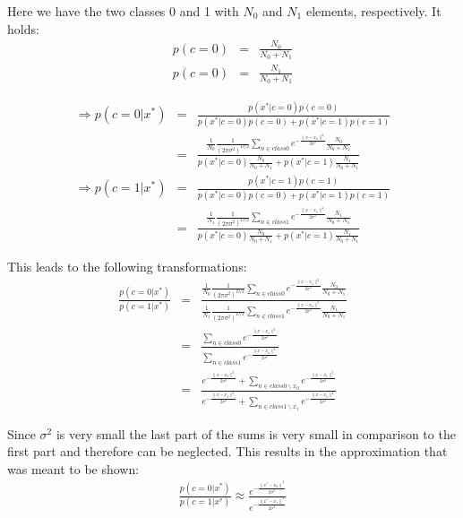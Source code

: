 \documentclass{article}
\begin{document}
Here we have the two classes 0 and 1 with $N_0$ and $N_1$ elements, respectively.
It holds:
\begin{eqnarray}
p(c = 0) &=& \frac{N_0}{N_0 + N_1}\\
p(c = 0) &=& \frac{N_1}{N_0 + N_1}
\end{eqnarray}

\begin{eqnarray}
\Rightarrow p(c = 0 | x^*) &=& \frac{p(x^* | c = 0)p(c = 0)}{p(x^* | c = 0)p(c = 0) + p(x^* | c = 1)p(c = 1)}\\
&=& \frac{\frac{1}{N_0} \frac{1}{(2\pi \sigma^2)^{D/2}} \sum_{n \in class 0}{e^{-\frac{\|x -x_n\|^2}{2 \sigma^2}}}\frac{N_0}{N_0 + N_1}}{p(x^* | c = 0)\frac{N_0}{N_0 + N_1} + p(x^* | c = 1)\frac{N_1}{N_0 + N_1}}\\
\Rightarrow p(c = 1 | x^*) &=& \frac{p(x^* | c = 1)p(c = 1)}{p(x^* | c = 0)p(c = 0) + p(x^* | c = 1)p(c = 1)}\\
&=& \frac{\frac{1}{N_1} \frac{1}{(2\pi \sigma^2)^{D/2}} \sum_{n \in class 1}{e^{-\frac{\|x -x_n\|^2}{2 \sigma^2}}}\frac{N_1}{N_0 + N_1}}{p(x^* | c = 0)\frac{N_0}{N_0 + N_1} + p(x^* | c = 1)\frac{N_1}{N_0 + N_1}}
\end{eqnarray}

This leads to the following transformations:
\begin{eqnarray}
\frac{p(c=0|x^*)}{p(c=1|x^*)} &=& \frac{\frac{1}{N_0} \frac{1}{(2\pi \sigma^2)^{D/2}} \sum_{n \in class 0}{e^{-\frac{\|x -x_n\|^2}{2 \sigma^2}}}\frac{N_0}{N_0 + N_1}}{\frac{1}{N_1} \frac{1}{(2\pi \sigma^2)^{D/2}} \sum_{n \in class 1}{e^{-\frac{\|x -x_n\|^2}{2 \sigma^2}}}\frac{N_1}{N_0 + N_1}}\\
&=& \frac{\sum_{n \in class 0}{e^{-\frac{\|x -x_n\|^2}{2 \sigma^2}}}}{\sum_{n \in class 1}{e^{-\frac{\|x -x_n\|^2}{2 \sigma^2}}}}\\
&=& \frac{e^{-\frac{\|x -x_0\|^2}{2 \sigma^2}} + \sum_{n \in class 0 \backslash x_0}{e^{-\frac{\|x -x_n\|^2}{2 \sigma^2}}}}{e^{-\frac{\|x -x_1\|^2}{2 \sigma^2}} + \sum_{n \in class 1 \backslash x_1}{e^{-\frac{\|x -x_n\|^2}{2 \sigma^2}}}}
\end{eqnarray}

Since $\sigma ^2$ is very small the last part of the sums is very small in comparison to the first part and therefore can be neglected.
This results in the approximation that was meant to be shown:
\begin{eqnarray}
\frac{p(c=0|x^*)}{p(c=1|x^*)} \approx \frac{e^{-\frac{{\|x^*-x_0\|}^2}{2\sigma^2}}}{e^{-\frac{{\|x^*-x_1\|}^2}{2\sigma^2}}}
\end{eqnarray}
\end{document}
